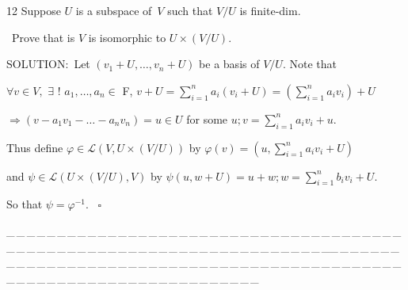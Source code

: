 \documentclass[a4paper, 11pt, UTF8]{article}
\def\Lm{\mathcal{L}}
\begin{document}
\begin{large}
{\timesbf\Large 12} {\timessl\Large 
Suppose $U$ is a subspace of \,$V$ such that $V/U$ is finite-dim.}\par\quad\,
{\timessl\Large Prove that is $V$ is isomorphic to $U\times (V/U)$.
}\par
{\timesbf S\footnotesize{OLUTION:}}\,\,\,Let $(v_1+U,\dots,v_n+U)$ be a basis of $V/U$. Note that\par\quad
$\forall v\in V,\,\,\exists\,\,!\,\,a_1,\dots,a_n\in$ {\timesbf F}, $v+U=\sum\limits_{i=1}^n a_i(v_i+U)=(\sum\limits_{i=1}^n a_i v_i)+U$\par\quad
$\Rightarrow(v-a_1 v_1-\dots-a_n v_n)=u\in U$ for some $u;v=\sum\limits_{i=1}^n a_i v_i+u$.\par\quad
Thus define $\varphi\in\Lm(V,U\times(V/U))$ by $\varphi(v)=(u,\sum\limits_{i=1}^n a_i v_i+U)$\par\qquad\qquad
and $\psi\in\Lm(U\times(V/U),V)$ by $\psi(u,w+U)=u+w;w=\sum\limits_{i=1}^n b_i v_i+U$.\par\quad
So that $\psi=\varphi^{-1}.\,\,\,\,\,\square$\par
{\tiny \_\,\_\,\_\,\_\,\_\,\_\,\_\,\_\,\_\,\_\,\_\,\_\,\_\,\_\,\_\,\_\,\_\,\_\,\_\,\_\,\_\,\_\,\_\,\_\,\_\,\_\,\_\,\_\,\_\,\_\,\_\,\_\,\_\,\_\,\_\,\_\,\_\,\_\,\_\,\_\,\_\,\_\,\_\,\_\,\_\,\_\,\_\,\_\,\_\,\_\,\_\,\_\,\_\,\_\,\_\,\_\,\_\,\_\,\_\,\_\,\_\,\_\,\_\,\_\,\_\,\_\,\_\,\_\,\_\,\_\,\_\_\,\_\,\_\,\_\,\_\,\_\,\_\,\_\,\_\,\_\,\_\,\_\,\_\,\_\,\_\,\_\,\_\,\_\,\_\,\_\,\_\,\_\,\_\,\_\,\_\,\_\,\_\,\_\,\_\,\_\,\_\,\_\,\_\,\_\,\_\,\_\,\_\,\_\,\_\,\_\,\_\,\_\,\_\,\_\,\_\,\_\,\_\,\_\,\_\,\_\,\_\,\_\,\_\,\_\,\_\,\_\,\_\,\_\,\_\,\_\,\_\,\_\,\_\,\_\,\_\,\_\,\_\,\_\,\_\,\_\,\_}{\tiny\,\par}


\end{large}
\end{document}
